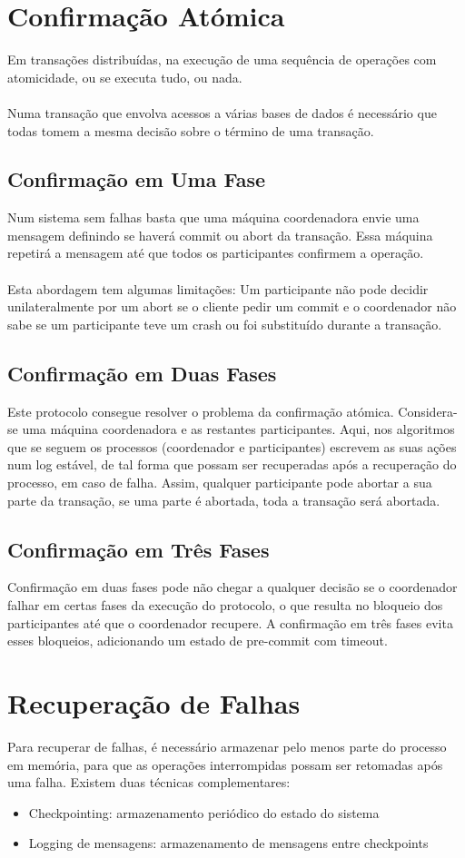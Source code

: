 \documentclass[10pt,a4paper]{report}
\begin{document}
\section{Confirmação Atómica}
Em transações distribuídas, na execução de uma sequência de operações com atomicidade, ou se executa tudo, ou nada.\\
\\
Numa transação que envolva acessos a várias bases de dados é necessário que todas tomem a mesma decisão sobre o término de uma transação.
\subsection{Confirmação em Uma Fase}
Num sistema sem falhas basta que uma máquina coordenadora envie uma mensagem definindo se haverá commit ou abort da transação. Essa máquina repetirá a mensagem até que todos os participantes confirmem a operação.\\
\\
Esta abordagem tem algumas limitações: Um participante não pode decidir unilateralmente por um abort se o cliente pedir um commit e o coordenador não sabe se um participante teve um crash ou foi substituído durante a transação.
\subsection{Confirmação em Duas Fases}
Este protocolo consegue resolver o problema da confirmação atómica. Considera-se uma máquina coordenadora e as restantes participantes. Aqui, nos algoritmos que se seguem os processos (coordenador e participantes) escrevem as suas ações num log estável, de tal forma que possam ser recuperadas após a recuperação do processo, em caso de falha. Assim, qualquer participante pode abortar a sua parte da transação, se uma parte é abortada, toda a transação será abortada.
\subsection{Confirmação em Três Fases}
Confirmação em duas fases pode não chegar a qualquer decisão se o coordenador falhar em certas fases da execução do protocolo, o que resulta no bloqueio dos participantes até que o coordenador recupere. A confirmação em três fases evita esses bloqueios, adicionando um estado de pre-commit com timeout.
\section{Recuperação de Falhas}
Para recuperar de falhas, é necessário armazenar pelo menos parte do processo em memória, para que as operações interrompidas possam ser retomadas após uma falha. Existem duas técnicas complementares:
\begin{itemize}
\item Checkpointing: armazenamento periódico do estado do sistema
\item Logging de mensagens: armazenamento de mensagens entre checkpoints
\end{itemize}
\end{document}
